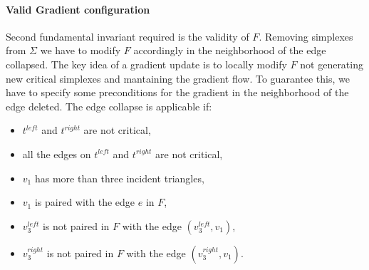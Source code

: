 \documentclass[preprint,5p,times,onecolumn]{article}
\begin{document}
\paragraph{Valid Gradient configuration} 
Second fundamental invariant required is the validity of $F$. Removing simplexes from $\Sigma$ we have to modify $F$ accordingly in the neighborhood of the edge collapsed. The key idea of a gradient update is to locally modify $F$ not generating new critical simplexes and mantaining the gradient flow. To guarantee this, we have to specify some preconditions for the gradient in the neighborhood of the edge deleted. The edge collapse is applicable if:

\begin{itemize}
	\item $t^{left}$ and $t^{right}$ are not critical,
	\item all the edges on $t^{left}$ and $t^{right}$ are not critical,
	\item $v_1$ has more than three incident triangles,
	\item $v_1$ is paired with the edge $e$ in $F$,
	\item $v_3^{left}$ is not paired in $F$ with the edge $(v_3^{left}, v_1)$,
	\item $v_3^{right}$ is not paired in $F$ with the edge $(v_3^{right}, v_1)$.\\
\end{itemize}
\end{document}
